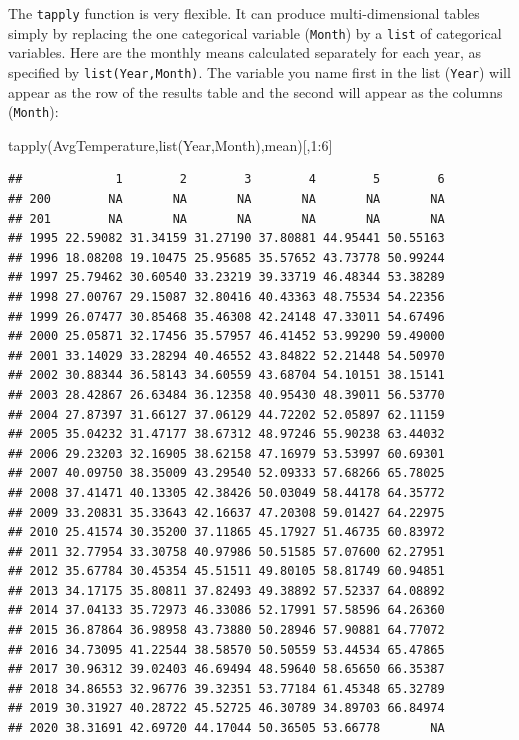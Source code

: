 \documentclass[
]{book}
\newenvironment{Shaded}{\begin{snugshade}}{\end{snugshade}}
\newcommand{\DecValTok}[1]{\textcolor[rgb]{0.00,0.00,0.81}{#1}}
\newcommand{\FunctionTok}[1]{\textcolor[rgb]{0.00,0.00,0.00}{#1}}
\newcommand{\NormalTok}[1]{#1}
\newcommand{\SpecialCharTok}[1]{\textcolor[rgb]{0.00,0.00,0.00}{#1}}
\theoremstyle{definition}
\theoremstyle{definition}
\theoremstyle{definition}
\theoremstyle{definition}
\theoremstyle{remark}
\begin{document}
The \texttt{tapply} function is very flexible. It can produce multi-dimensional tables simply by replacing the one categorical variable (\texttt{Month}) by a \texttt{list} of categorical variables. Here are the monthly means calculated separately for each year, as specified by \texttt{list(Year,Month)}. The variable you name first in the list (\texttt{Year}) will appear as the row of the results table and the second will appear as the columns (\texttt{Month}):

\begin{Shaded}
\begin{Highlighting}[]
\FunctionTok{tapply}\NormalTok{(AvgTemperature,}\FunctionTok{list}\NormalTok{(Year,Month),mean)[,}\DecValTok{1}\SpecialCharTok{:}\DecValTok{6}\NormalTok{]}
\end{Highlighting}
\end{Shaded}

\begin{verbatim}
##             1        2        3        4        5        6
## 200        NA       NA       NA       NA       NA       NA
## 201        NA       NA       NA       NA       NA       NA
## 1995 22.59082 31.34159 31.27190 37.80881 44.95441 50.55163
## 1996 18.08208 19.10475 25.95685 35.57652 43.73778 50.99244
## 1997 25.79462 30.60540 33.23219 39.33719 46.48344 53.38289
## 1998 27.00767 29.15087 32.80416 40.43363 48.75534 54.22356
## 1999 26.07477 30.85468 35.46308 42.24148 47.33011 54.67496
## 2000 25.05871 32.17456 35.57957 46.41452 53.99290 59.49000
## 2001 33.14029 33.28294 40.46552 43.84822 52.21448 54.50970
## 2002 30.88344 36.58143 34.60559 43.68704 54.10151 38.15141
## 2003 28.42867 26.63484 36.12358 40.95430 48.39011 56.53770
## 2004 27.87397 31.66127 37.06129 44.72202 52.05897 62.11159
## 2005 35.04232 31.47177 38.67312 48.97246 55.90238 63.44032
## 2006 29.23203 32.16905 38.62158 47.16979 53.53997 60.69301
## 2007 40.09750 38.35009 43.29540 52.09333 57.68266 65.78025
## 2008 37.41471 40.13305 42.38426 50.03049 58.44178 64.35772
## 2009 33.20831 35.33643 42.16637 47.20308 59.01427 64.22975
## 2010 25.41574 30.35200 37.11865 45.17927 51.46735 60.83972
## 2011 32.77954 33.30758 40.97986 50.51585 57.07600 62.27951
## 2012 35.67784 30.45354 45.51511 49.80105 58.81749 60.94851
## 2013 34.17175 35.80811 37.82493 49.38892 57.52337 64.08892
## 2014 37.04133 35.72973 46.33086 52.17991 57.58596 64.26360
## 2015 36.87864 36.98958 43.73880 50.28946 57.90881 64.77072
## 2016 34.73095 41.22544 38.58570 50.50559 53.44534 65.47865
## 2017 30.96312 39.02403 46.69494 48.59640 58.65650 66.35387
## 2018 34.86553 32.96776 39.32351 53.77184 61.45348 65.32789
## 2019 30.31927 40.28722 45.52725 46.30789 34.89703 66.84974
## 2020 38.31691 42.69720 44.17044 50.36505 53.66778       NA
\end{verbatim}
\end{document}

